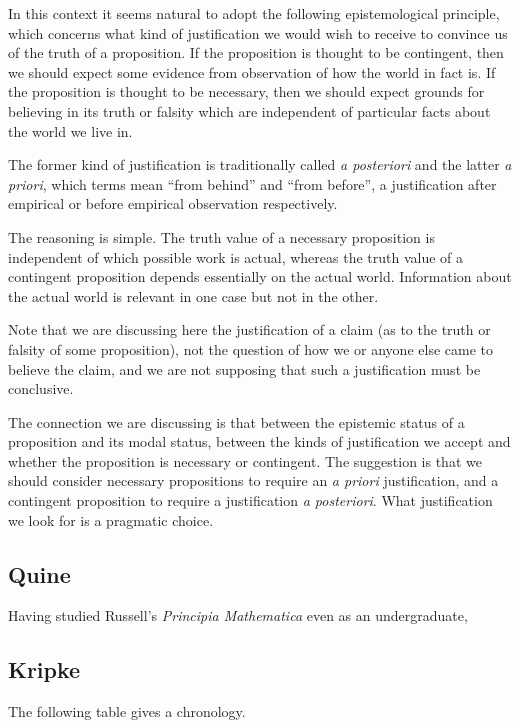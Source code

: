 {In this context it seems natural to adopt the following
epistemological principle, which concerns what kind of justification
we would wish to receive to convince us of the truth of a proposition.
If the proposition is thought to be contingent, then we should expect
some evidence from observation of how the world in fact is.
If the proposition is thought to be necessary, then we should expect
grounds for believing in its truth or falsity which are independent of
particular facts about the world we live in.

The former kind of justification is traditionally called \emph{a
  posteriori} and the latter \emph{a priori}, which terms mean ``from
behind'' and ``from before'', a justification after empirical or
before empirical observation respectively.

The reasoning is simple.
The truth value of a necessary proposition is independent of which
possible work is actual, whereas the truth value of a contingent
proposition depends essentially on the actual world.
Information about the actual world is relevant in one case but not in
the other.

Note that we are discussing here the justification of a claim (as to
the truth or falsity of some proposition), not the
question of how we or anyone else came to believe the claim, and we
are not supposing that such a justification must be conclusive.

The connection we are discussing is that between the epistemic status
of a proposition and its modal status, between the kinds of
justification we accept and whether the proposition is necessary or
contingent.
The suggestion is that we should consider necessary propositions to
require an \emph{a priori} justification, and a contingent proposition
to require a justification \emph{a posteriori}.
What justification we look for is a pragmatic choice.

}%


\subsection{Quine}

Having studied Russell's \emph{Principia Mathematica} even as an undergraduate, 

\subsection{Kripke}
The following table gives a chronology.


